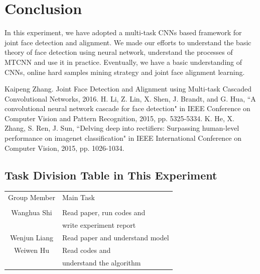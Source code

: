 \documentclass[journal, a4paper]{IEEEtran}
\begin{document}


\section{Conclusion}
	In this experiment, we have adopted a multi-task CNNs based framework for joint face detection and alignment. We made our efforts to understand the basic theory of face detection using neural network, understand the processes of MTCNN and use it in practice. Eventually, we have a basic understanding of CNNs, online hard samples mining strategy and joint face alignment learning.

\begin{thebibliography}{99}

	 Kaipeng Zhang. Joint Face Detection and Alignment using   Multi-task Cascaded Convolutional Networks, 2016.
	  H. Li, Z. Lin, X. Shen, J. Brandt, and G. Hua, ``A convolutional neural network cascade for face detection" in IEEE Conference on Computer Vision and Pattern Recognition, 2015, pp. 5325-5334.
	 K. He, X. Zhang, S. Ren, J. Sun, ``Delving deep into rectifiers: Surpassing human-level performance on imagenet classification" in IEEE International Conference on Computer Vision, 2015, pp. 1026-1034. 
\end{thebibliography}

\begin{appendices}
	\section{Task Division Table in This Experiment}
	\begin{center}
		\begin{tabular}{c|l}
			\hline
		  Group Member & Main Task \\
		     \\
			\hline
		    Wanghua Shi & Read paper, run codes and \\
		    & write experiment report \\
		    \hline
		    Wenjun Liang &  Read paper and understand model   \\  \hline
			Weiwen Hu &   Read codes and     \\
			&  understand the algorithm \\
			\hline
		\end{tabular}
	\end{center}
\end{appendices}
\end{document}
